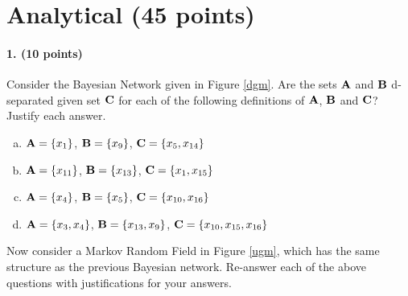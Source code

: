 \documentclass[11pt]{article}
\begin{document}
\section{Analytical (45 points)}
\paragraph{1. (10 points)} Consider the Bayesian Network given in Figure \ref{dgm}. Are the sets ${\bf A}$ and ${\bf B}$ d-separated given set ${\bf C}$ for each of the following definitions of ${\bf A}$, ${\bf B}$ and ${\bf C}$? Justify each answer.
\begin{enumerate}[a.]
\item ${\bf A} = \{x_1\}$, ${\bf B} = \{x_9\}$, ${\bf C} = \{x_5,x_{14}\}$
\item ${\bf A} = \{x_{11}\}$, ${\bf B} = \{x_{13}\}$, ${\bf C} = \{x_1,x_{15}\}$
\item ${\bf A} = \{x_4\}$, ${\bf B} = \{x_5\}$, ${\bf C} = \{x_{10},x_{16}\}$
\item ${\bf A} = \{x_3, x_4\}$, ${\bf B} = \{x_{13},x_9\}$, ${\bf C} = \{x_{10},x_{15},x_{16}\}$
\end{enumerate}
Now consider a Markov Random Field in Figure \ref{ugm}, which has the same structure as the previous Bayesian network.  Re-answer each of the above questions with justifications for your answers.
\end{document}
